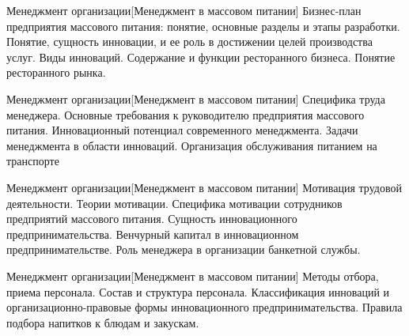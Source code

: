 \documentclass[
	11pt,
	a4paper,
	]
	{article}
\begin{document}
\vfill



\begin{minipage}[t][\miniH]{\miniL}\centering
	 {Менеджмент организации}[Менеджмент в массовом питании]
		{
			Бизнес-план предприятия массового питания: понятие, основные разделы и этапы разработки.
		}{
			Понятие, сущность инновации, и ее роль в достижении целей производства услуг. Виды инноваций.
		}{
			Содержание и функции ресторанного бизнеса. Понятие ресторанного рынка.
		}
	\lowGE
\end{minipage}





\begin{minipage}[t][\miniH]{\miniL}\centering
	 {Менеджмент организации}[Менеджмент в массовом питании]
		{
			Специфика труда менеджера. Основные требования к руководителю предприятия массового питания.
		}{
			Инновационный потенциал современного менеджмента. Задачи менеджмента в области инноваций.
		}{
			Организация обслуживания питанием на транспорте
		}
	\lowGE
\end{minipage}

\vfill



\begin{minipage}[t][\miniH]{\miniL}\centering
	 {Менеджмент организации}[Менеджмент в массовом питании]
		{
			Мотивация трудовой деятельности. Теории мотивации. Специфика мотивации сотрудников предприятий массового питания.
		}{
			Сущность инновационного предпринимательства. Венчурный капитал в инновационном предпринимательстве.
		}{
			Роль менеджера в организации банкетной службы.
		}
	\lowGE
\end{minipage}

\vfill



\begin{minipage}[t][\miniH]{\miniL}\centering
	 {Менеджмент организации}[Менеджмент в массовом питании]
		{
			Методы отбора, приема персонала. Состав и структура персонала.
		}{
			Классификация инноваций и организационно-правовые формы инновационного предпринимательства.
		}{
			Правила подбора напитков к блюдам и закускам.
		}
	\lowGE
\end{minipage}
\end{document}
